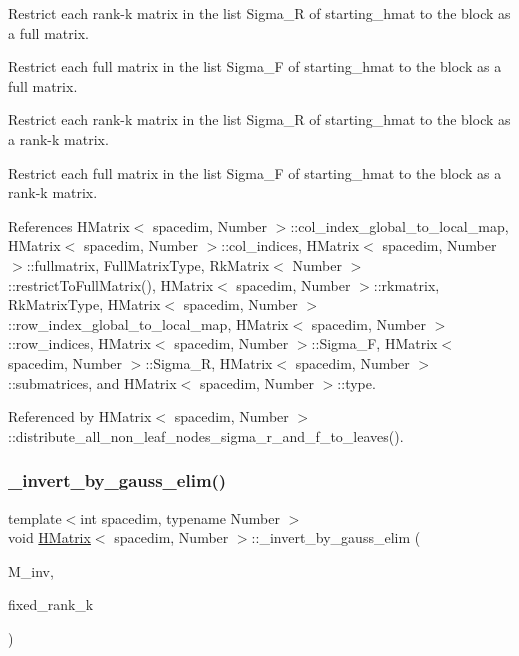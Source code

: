 Restrict each rank-\/k matrix in the list {\ttfamily Sigma\+\_\+R} of {\ttfamily starting\+\_\+hmat} to the block as a full matrix.

Restrict each full matrix in the list {\ttfamily Sigma\+\_\+F} of {\ttfamily starting\+\_\+hmat} to the block as a full matrix.

Restrict each rank-\/k matrix in the list {\ttfamily Sigma\+\_\+R} of {\ttfamily starting\+\_\+hmat} to the block as a rank-\/k matrix.

Restrict each full matrix in the list {\ttfamily Sigma\+\_\+F} of {\ttfamily starting\+\_\+hmat} to the block as a rank-\/k matrix.

References H\+Matrix$<$ spacedim, Number $>$\+::col\+\_\+index\+\_\+global\+\_\+to\+\_\+local\+\_\+map, H\+Matrix$<$ spacedim, Number $>$\+::col\+\_\+indices, H\+Matrix$<$ spacedim, Number $>$\+::fullmatrix, Full\+Matrix\+Type, Rk\+Matrix$<$ Number $>$\+::restrict\+To\+Full\+Matrix(), H\+Matrix$<$ spacedim, Number $>$\+::rkmatrix, Rk\+Matrix\+Type, H\+Matrix$<$ spacedim, Number $>$\+::row\+\_\+index\+\_\+global\+\_\+to\+\_\+local\+\_\+map, H\+Matrix$<$ spacedim, Number $>$\+::row\+\_\+indices, H\+Matrix$<$ spacedim, Number $>$\+::\+Sigma\+\_\+F, H\+Matrix$<$ spacedim, Number $>$\+::\+Sigma\+\_\+R, H\+Matrix$<$ spacedim, Number $>$\+::submatrices, and H\+Matrix$<$ spacedim, Number $>$\+::type.



Referenced by H\+Matrix$<$ spacedim, Number $>$\+::distribute\+\_\+all\+\_\+non\+\_\+leaf\+\_\+nodes\+\_\+sigma\+\_\+r\+\_\+and\+\_\+f\+\_\+to\+\_\+leaves().

\mbox{\label{classHMatrix_af74e3b0c19e9178cfe699a6620a51170}} 
\subsubsection{\texorpdfstring{\+\_\+invert\+\_\+by\+\_\+gauss\+\_\+elim()}{\_invert\_by\_gauss\_elim()}}
{\footnotesize\ttfamily template$<$int spacedim, typename Number $>$ \\
void \hyperlink{classHMatrix}{H\+Matrix}$<$ spacedim, Number $>$\+::\+\_\+invert\+\_\+by\+\_\+gauss\+\_\+elim (\begin{DoxyParamCaption}\item[{\hyperlink{classHMatrix}{H\+Matrix}$<$ spacedim, Number $>$ \&}]{M\+\_\+inv,  }\item[{const \hyperlink{classHMatrix_a5ca8dc549783d38371a01ecd621ecb34}{size\+\_\+type}}]{fixed\+\_\+rank\+\_\+k }\end{DoxyParamCaption})\hspace{0.3cm}{\ttfamily [private]}}

